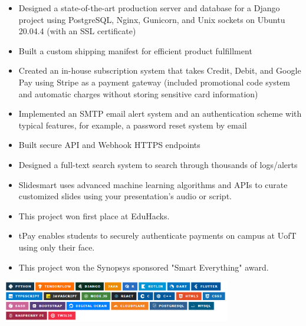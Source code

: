 \documentclass[10pt,a4paper,ragged2e]{altacv}
\begin{document}
\begin{itemize}
\item Designed a state-of-the-art production server and database for a
Django project using PostgreSQL, Nginx, Gunicorn, and Unix
sockets on Ubuntu 20.04.4 (with an SSL certificate)
\smallskip
\item Built a custom shipping manifest for efficient product fulfillment
\smallskip
\item Created an in-house subscription system that takes Credit, Debit,
and Google Pay using Stripe as a payment gateway (included
promotional code system and automatic charges without storing
sensitive card information)
\item Implemented an SMTP email alert system and an authentication scheme with typical features, for
example, a password reset system by email
\smallskip
\item Built secure API and Webhook HTTPS endpoints
\smallskip
\item Designed a full-text search system to search through thousands of logs/alerts
\smallskip
\end{itemize}


\begin{itemize}
\item Slidesmart uses advanced machine learning algorithms and APIs to curate customized slides using your presentation's audio or script.
\item This project won first place at EduHacks.
\end{itemize}
\cvproject{}
\begin{itemize}
\item tPay enables students to securely authenticate payments on campus at UofT using only their face.
\item This project won the Synopsys sponsored "Smart Everything" award.
\end{itemize}
\cvproject{}

\includegraphics[width=100mm,scale=0.6]{favourite technologies 2}
\end{document}
